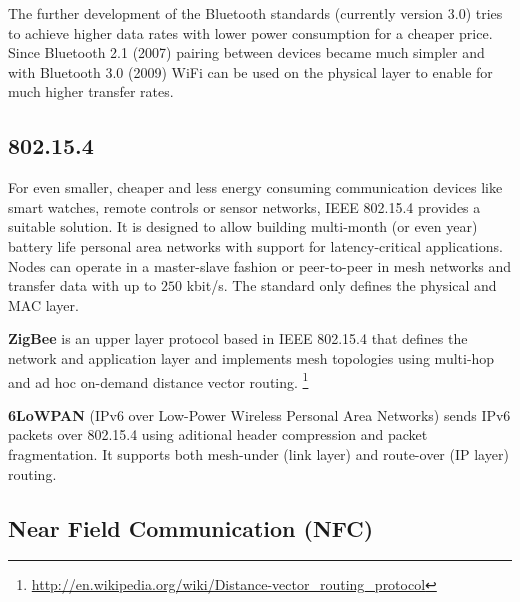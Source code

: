 \documentclass{article}
\begin{document}
\begin{multicols}{2}
The further development of the Bluetooth standards (currently version 3.0) tries
to achieve higher data rates with lower power consumption for a cheaper price.
Since Bluetooth 2.1 (2007) pairing between devices became much simpler and with
Bluetooth 3.0 (2009) WiFi can be used on the physical layer to enable for much
higher transfer rates.

\subsection{802.15.4}
For even smaller, cheaper and less energy consuming communication devices like
smart watches, remote controls or sensor networks, IEEE 802.15.4 provides a
suitable solution. It is designed to allow building multi-month (or even year)
battery life personal area networks with support for latency-critical
applications. Nodes can operate in a master-slave fashion or peer-to-peer in
mesh networks and transfer data with up to $250$ kbit/s. The standard only
defines the physical and MAC layer.


{\bf ZigBee} is an upper layer protocol based in IEEE 802.15.4 that defines the
network and application layer and implements mesh topologies using multi-hop and
ad hoc on-demand distance vector
routing.%
\footnote{\href{http://en.wikipedia.org/wiki/Distance-vector_routing_protocol}
{http://en.wikipedia.org/wiki/Distance-vector\_routing\_protocol}}


{\bf 6LoWPAN} (IPv6 over Low-Power Wireless Personal Area Networks) sends IPv6
packets over 802.15.4 using aditional header compression and packet
fragmentation. It supports both mesh-under (link layer) and route-over (IP
layer) routing.

\subsection{Near Field Communication (NFC)}




\clearpage
\end{multicols}
\end{document}
